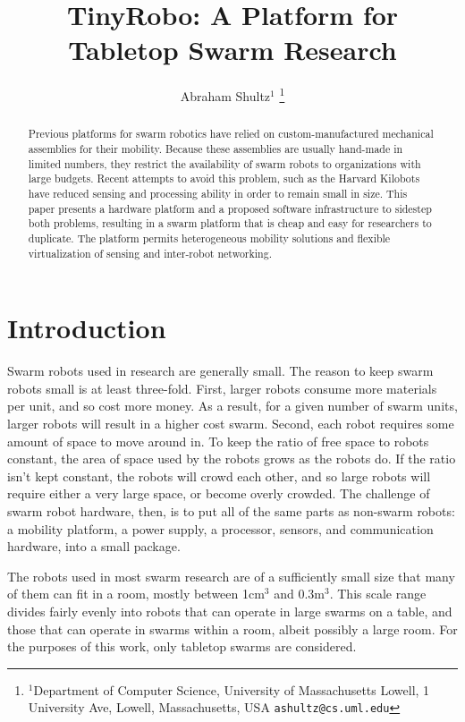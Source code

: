 \documentclass[letterpaper, 10 pt, conference]{ieeeconf}  %
\title{\LARGE \bf
TinyRobo: A Platform for Tabletop Swarm Research
}
\author{Abraham Shultz$^{1}$%
\thanks{$^{1}$Department of Computer Science,
        University of Massachusetts Lowell, 1 University Ave, Lowell, Massachusetts, USA
        {\tt\small ashultz@cs.uml.edu}}%
}
\begin{document}
\maketitle
\thispagestyle{empty}
\pagestyle{empty}


\begin{abstract}

Previous platforms for swarm robotics have relied on custom-manufactured mechanical assemblies for their mobility. Because these assemblies are usually hand-made in limited numbers, they restrict the availability of swarm robots to organizations with large budgets. Recent attempts to avoid this problem, such as the Harvard Kilobots \cite{rubenstein2014kilobot} have reduced sensing and processing ability in order to remain small in size. This paper presents a hardware platform and a proposed software infrastructure to sidestep both problems, resulting in a swarm platform that is cheap and easy for researchers to duplicate. The platform permits heterogeneous mobility solutions and flexible virtualization of sensing and inter-robot networking.   

\end{abstract}


\section{Introduction}

Swarm robots used in research are generally small. 
The reason to keep swarm robots small is at least three-fold. 
First, larger robots consume more materials per unit, and so cost more money.
As a result, for a given number of swarm units, larger robots will result in a higher cost swarm. 
Second, each robot requires some amount of space to move around in. 
To keep the ratio of free space to robots constant, the area of space used by the robots grows as the robots do. 
If the ratio isn't kept constant, the robots will crowd each other, and so large robots will require either a very large space, or become overly crowded. 
The challenge of swarm robot hardware, then, is to put all of the same parts as non-swarm robots: a mobility platform, a power supply, a processor, sensors, and communication hardware, into a small package.

The robots used in most swarm research are of a sufficiently small size that many of them can fit in a room, mostly between 1cm$^3$ and 0.3m$^3$. 
This scale range divides fairly evenly into robots that can operate in large swarms on a table, and those that can operate in swarms within a room, albeit possibly a large room. 
For the purposes of this work, only tabletop swarms are considered. 
\end{document}
